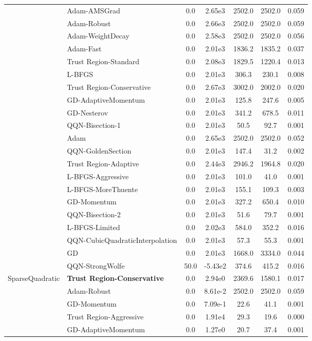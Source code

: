 \documentclass{article}
\begin{document}
\begin{table}[htbp]
{\begin{tabular}{p{2.5cm}p{2.5cm}*{5}{c}}
 & Adam-AMSGrad & 0.0 & 2.65e3 & 2502.0 & 2502.0 & 0.059 \\
 & Adam-Robust & 0.0 & 2.66e3 & 2502.0 & 2502.0 & 0.059 \\
 & Adam-WeightDecay & 0.0 & 2.58e3 & 2502.0 & 2502.0 & 0.056 \\
 & Adam-Fast & 0.0 & 2.01e3 & 1836.2 & 1835.2 & 0.037 \\
 & Trust Region-Standard & 0.0 & 2.08e3 & 1829.5 & 1220.4 & 0.013 \\
 & L-BFGS & 0.0 & 2.01e3 & 306.3 & 230.1 & 0.008 \\
 & Trust Region-Conservative & 0.0 & 2.67e3 & 3002.0 & 2002.0 & 0.020 \\
 & GD-AdaptiveMomentum & 0.0 & 2.01e3 & 125.8 & 247.6 & 0.005 \\
 & GD-Nesterov & 0.0 & 2.01e3 & 341.2 & 678.5 & 0.011 \\
 & QQN-Bisection-1 & 0.0 & 2.01e3 & 50.5 & 92.7 & 0.001 \\
 & Adam & 0.0 & 2.65e3 & 2502.0 & 2502.0 & 0.052 \\
 & QQN-GoldenSection & 0.0 & 2.01e3 & 147.4 & 31.2 & 0.002 \\
 & Trust Region-Adaptive & 0.0 & 2.44e3 & 2946.2 & 1964.8 & 0.020 \\
 & L-BFGS-Aggressive & 0.0 & 2.01e3 & 101.0 & 41.0 & 0.001 \\
 & L-BFGS-MoreThuente & 0.0 & 2.01e3 & 155.1 & 109.3 & 0.003 \\
 & GD-Momentum & 0.0 & 2.01e3 & 327.2 & 650.4 & 0.010 \\
 & QQN-Bisection-2 & 0.0 & 2.01e3 & 51.6 & 79.7 & 0.001 \\
 & L-BFGS-Limited & 0.0 & 2.02e3 & 584.0 & 352.2 & 0.016 \\
 & QQN-CubicQuadraticInterpolation & 0.0 & 2.01e3 & 57.3 & 55.3 & 0.001 \\
 & GD & 0.0 & 2.01e3 & 1668.0 & 3334.0 & 0.044 \\
 & QQN-StrongWolfe & 50.0 & -5.43e2 & 374.6 & 415.2 & 0.016 \\
\midrule
\multirow{25}{*}{SparseQuadratic} & \textbf{Trust Region-Conservative} & 0.0 & 2.94e0 & 2369.6 & 1580.1 & 0.017 \\
 & Adam-Robust & 0.0 & 8.61e-2 & 2502.0 & 2502.0 & 0.059 \\
 & GD-Momentum & 0.0 & 7.09e-1 & 22.6 & 41.1 & 0.001 \\
 & Trust Region-Aggressive & 0.0 & 1.91e4 & 29.3 & 19.6 & 0.000 \\
 & GD-AdaptiveMomentum & 0.0 & 1.27e0 & 20.7 & 37.4 & 0.001 \\

\end{tabular}}
\end{table}
\end{document}
